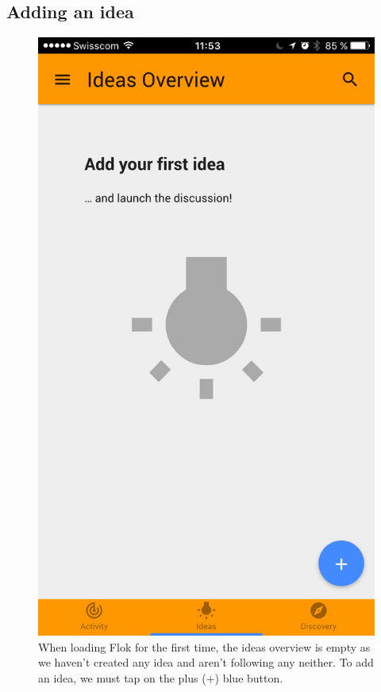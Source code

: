 \documentclass[a4paper,12pt,twoside]{article}
\begin{document}
\subsection{Adding an idea}
\label{sec.addingIdea}

\begin{figure}[!htb]
    \begin{minipage}[t]{.32\textwidth}
        \centering
        \includegraphics[width=\textwidth]{images/flow_addIdea_1.png}
        \caption{When loading Flok for the first time, the ideas overview is empty as we haven't created any idea and aren't following any neither. To add an idea, we must tap on the plus (+) blue button.}

\end{minipage}
\end{figure}
\end{document}
